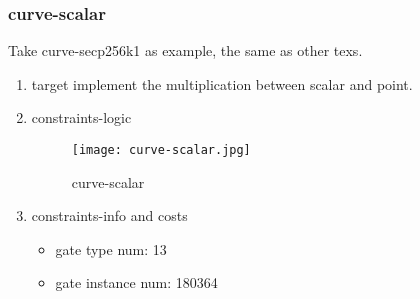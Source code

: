 \subsubsection{curve-scalar}
\label{curve-scalar}

Take curve-secp256k1 as example, the same as other texs.

\begin{enumerate}
    \item target
        implement the multiplication between scalar and point. 
    \item constraints-logic
        \begin{figure}[!ht]
            \centering
            \texttt{[image: curve-scalar.jpg]}
            \caption{curve-scalar}
            \label{fig:curve-scalar}
        \end{figure}
    
    \item constraints-info and costs
        \begin{itemize}
            \item gate type num: 13 
            \item gate instance num: 180364          
        \end{itemize}
\end{enumerate}